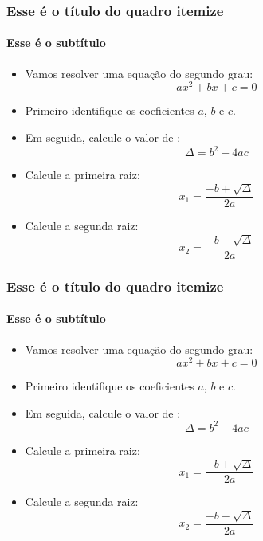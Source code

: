 \documentclass{beamer}
\begin{document}
	\begin{frame}
		\frametitle{Esse é o título do quadro itemize}
		\framesubtitle{Esse é o subtítulo}

		\begin{itemize}				
		
		\item<1- | alert@1-> Vamos resolver uma equação do segundo grau:
		$$ax^2 + bx + c = 0$$ 
		
		\item<2- | alert@2> Primeiro identifique os coeficientes $a$, $b$ e $c$.
		
		\item<3- | alert@4> Em seguida, calcule o valor de :
		$$\Delta = b^2 - 4ac$$
		
		\item<4-> Calcule a primeira raiz:
		$$x_1 = \frac{-b + \sqrt{\Delta}}{2a}$$
		
		\item<5-> Calcule a segunda raiz:
		$$x_2 = \frac{-b - \sqrt{\Delta}}{2a}$$
		
		\end{itemize}
		
	\end{frame}	
	
		\begin{frame}[<+- | alert@+>]
		\frametitle{Esse é o título do quadro itemize}
		\framesubtitle{Esse é o subtítulo}

		\begin{itemize}				
		
		\item Vamos resolver uma equação do segundo grau:
		$$ax^2 + bx + c = 0$$ 
		
		\item Primeiro identifique os coeficientes $a$, $b$ e $c$.
		
		\item Em seguida, calcule o valor de :
		$$\Delta = b^2 - 4ac$$
		
		\item Calcule a primeira raiz:
		$$x_1 = \frac{-b + \sqrt{\Delta}}{2a}$$
		
		\item Calcule a segunda raiz:
		$$x_2 = \frac{-b - \sqrt{\Delta}}{2a}$$
		
		\end{itemize}
		
	\end{frame}	
	
\end{document}
